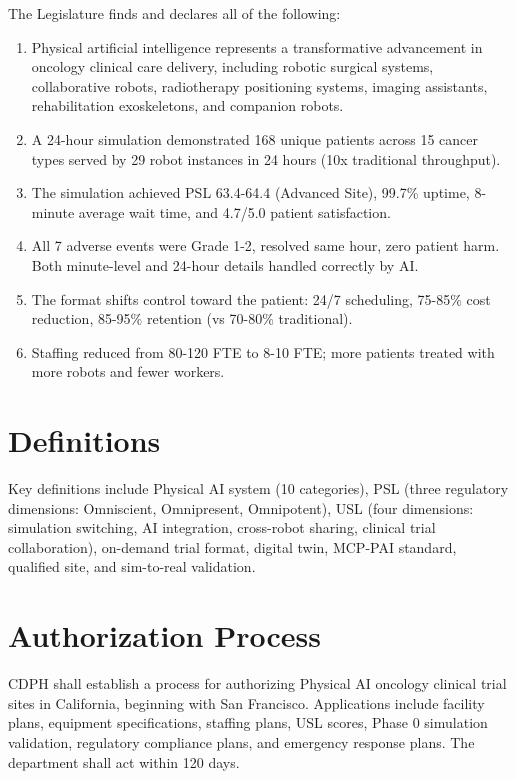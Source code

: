 \documentclass[11pt,letterpaper]{article}
\begin{document}
The Legislature finds and declares all of the following:

\begin{enumerate}[label=(\alph*)]
\item Physical artificial intelligence represents a transformative advancement
  in oncology clinical care delivery, including robotic surgical systems,
  collaborative robots, radiotherapy positioning systems, imaging assistants,
  rehabilitation exoskeletons, and companion robots.
\item A 24-hour simulation demonstrated 168 unique patients across 15 cancer
  types served by 29 robot instances in 24 hours (10x traditional throughput).
\item The simulation achieved PSL 63.4-64.4 (Advanced Site), 99.7\% uptime,
  8-minute average wait time, and 4.7/5.0 patient satisfaction.
\item All 7 adverse events were Grade 1-2, resolved same hour, zero patient
  harm. Both minute-level and 24-hour details handled correctly by AI.
\item The format shifts control toward the patient: 24/7 scheduling, 75-85\%
  cost reduction, 85-95\% retention (vs 70-80\% traditional).
\item Staffing reduced from 80-120 FTE to 8-10 FTE; more patients treated with
  more robots and fewer workers.
\end{enumerate}

\section{Definitions}

Key definitions include Physical AI system (10 categories), PSL (three
regulatory dimensions: Omniscient, Omnipresent, Omnipotent), USL (four
dimensions: simulation switching, AI integration, cross-robot sharing,
clinical trial collaboration), on-demand trial format, digital twin, MCP-PAI
standard, qualified site, and sim-to-real validation.

\section{Authorization Process}

CDPH shall establish a process for authorizing Physical AI oncology clinical
trial sites in California, beginning with San Francisco. Applications include
facility plans, equipment specifications, staffing plans, USL scores, Phase 0
simulation validation, regulatory compliance plans, and emergency response
plans. The department shall act within 120 days.
\end{document}
